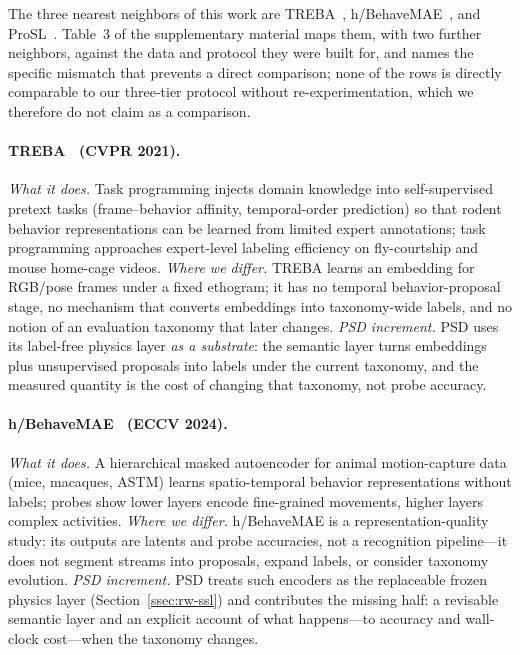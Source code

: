The three nearest neighbors of this work are TREBA~\citep{sun2021treba}, h/BehaveMAE~\citep{stoffl2024behavemae}, and ProSL~\citep{qin2025prosl}. Table~3 of the supplementary material maps them, with two further neighbors, against the data and protocol they were built for, and names the specific mismatch that prevents a direct comparison; none of the rows is directly comparable to our three-tier protocol without re-experimentation, which we therefore do not claim as a comparison.

\paragraph{TREBA~\citep{sun2021treba} (CVPR 2021).}
\emph{What it does.} Task programming injects domain knowledge into self-supervised pretext tasks (frame--behavior affinity, temporal-order prediction) so that rodent behavior representations can be learned from limited expert annotations; task programming approaches expert-level labeling efficiency on fly-courtship and mouse home-cage videos. \emph{Where we differ.} TREBA learns an embedding for RGB/pose frames under a fixed ethogram; it has no temporal behavior-proposal stage, no mechanism that converts embeddings into taxonomy-wide labels, and no notion of an evaluation taxonomy that later changes. \emph{PSD increment.} PSD uses its label-free physics layer \emph{as a substrate}: the semantic layer turns embeddings plus unsupervised proposals into labels under the current taxonomy, and the measured quantity is the cost of changing that taxonomy, not probe accuracy.

\paragraph{h/BehaveMAE~\citep{stoffl2024behavemae} (ECCV 2024).}
\emph{What it does.} A hierarchical masked autoencoder for animal motion-capture data (mice, macaques, ASTM) learns spatio-temporal behavior representations without labels; probes show lower layers encode fine-grained movements, higher layers complex activities. \emph{Where we differ.} h/BehaveMAE is a representation-quality study: its outputs are latents and probe accuracies, not a recognition pipeline---it does not segment streams into proposals, expand labels, or consider taxonomy evolution. \emph{PSD increment.} PSD treats such encoders as the replaceable frozen physics layer (Section~\ref{ssec:rw-ssl}) and contributes the missing half: a revisable semantic layer and an explicit account of what happens---to accuracy and wall-clock cost---when the taxonomy changes.

